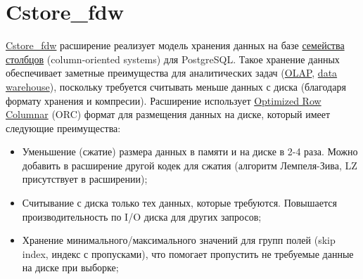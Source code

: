 \section{Cstore\_fdw}

\href{https://citusdata.github.io/cstore\_fdw/}{Cstore\_fdw} расширение реализует модель хранения данных на базе \href{https://en.wikipedia.org/wiki/Column-oriented\_DBMS}{семейства столбцов} (column-oriented systems) для PostgreSQL. Такое хранение данных   обеспечивает заметные преимущества для аналитических задач (\href{https://ru.wikipedia.org/wiki/OLAP}{OLAP}, \href{https://en.wikipedia.org/wiki/Data\_warehouse}{data warehouse}), поскольку требуется считывать меньше данных с диска (благодаря формату хранения и компресии). Расширение использует \href{https://cwiki.apache.org/confluence/display/Hive/LanguageManual+ORC#LanguageManualORC-ORCFileFormat}{Optimized Row Columnar} (ORC) формат для размещения данных на диске, который имеет следующие преимущества:

\begin{itemize}
  \item Уменьшение (сжатие) размера данных в памяти и на диске в 2-4 раза. Можно добавить в расширение другой кодек для сжатия (алгоритм Лемпеля-Зива, LZ присутствует в расширении);
  \item Считывание с диска только тех данных, которые требуются. Повышается производительность по I/O диска для других запросов;
  \item Хранение минимального/максимального значений для групп полей (skip index, индекс с пропусками), что помогает пропустить не требуемые данные на диске при выборке;
\end{itemize}

